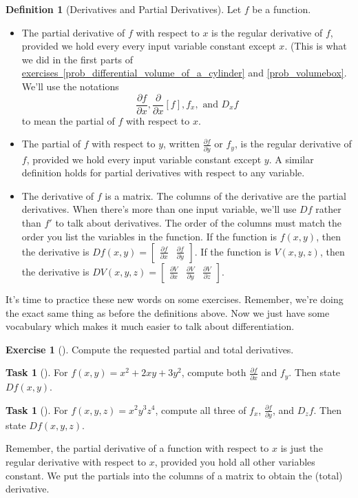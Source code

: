 \documentclass[10pt,]{book}
\theoremstyle{plain}
\theoremstyle{definition}
\newtheorem{definition}[theorem]{Definition}
\theoremstyle{definition}
\theoremstyle{definition}
\theoremstyle{definition}
\newtheorem{exploration}[project]{Exercise}
\newtheorem{task}[project]{Task}
\theoremstyle{definition}
\numberwithin{equation}{section}
\newcommand{\ds}{\displaystyle}
\newcommand{\amp}{&}
\begin{document}
%
\begin{definition}[{Derivatives and Partial Derivatives}]\label{definition-23}
Let \(f\) be a function. \leavevmode%
\begin{itemize}[label=\textbullet]
\item{}The partial derivative of \(f\) with respect to \(x\) is the regular derivative of \(f\), provided we hold every every input variable constant except \(x\). (This is what we did in the first parts of \hyperref[prob_differential_volume_of_a_cylinder]{exercises~\ref{prob_differential_volume_of_a_cylinder}} and \hyperref[prob_volumebox]{\ref{prob_volumebox}}.  We'll use the notations%
\begin{equation*}
\frac{\partial f}{\partial x}, 
\frac{\partial}{\partial x}[f],
f_x,
\text{ and } D_x f
\end{equation*}
to mean the partial of \(f\) with respect to \(x\).%
\item{}The partial of \(f\) with respect to \(y\), written \(\ds \frac{\partial f}{\partial y}\) or \(f_y\), is the regular derivative of \(f\), provided we hold every input variable constant except \(y\). A similar definition holds for partial derivatives with respect to any variable.%
\item{}The derivative of \(f\) is a matrix. The columns of the derivative are the partial derivatives. When there's more than one input variable, we'll use \(Df\) rather than \(f'\) to talk about derivatives.  The order of the columns must match the order you list the variables in the function. If the function is \(f(x,y)\), then the derivative is \(Df(x,y) = \begin{bmatrix}\frac{\partial f}{\partial x}\amp \frac{\partial f}{\partial y}
\end{bmatrix} .\) If the function is \(V(x,y,z)\), then the derivative is \(DV(x,y,z) = \begin{bmatrix}\frac{\partial V}{\partial x}\amp \frac{\partial V}{\partial y}\amp \frac{\partial V}{\partial z}
\end{bmatrix} .\)%
\end{itemize}
%
\end{definition}
It's time to practice these new words on some exercises. Remember, we're doing the exact same thing as before the definitions above. Now we just have some vocabulary which makes it much easier to talk about differentiation.%
\begin{exploration}[]\label{exploration-136}
Compute the requested partial and total derivatives.%
\begin{task}[]\label{task-285}
For \(f(x,y)=x^2+2xy+3y^2\), compute both \(\ds\frac{\partial f}{\partial x}\) and \(f_y\). Then state \(Df(x,y)\).%
\end{task}
\begin{task}[]\label{task-286}
For \(f(x,y,z)=x^2y^3z^4\), compute all three of \(f_x\), \(\ds\frac{\partial f}{\partial y}\), and \(D_z f\). Then state \(Df(x,y,z)\).%
\end{task}
Remember, the partial derivative of a function with respect to \(x\) is just the regular derivative with respect to \(x\), provided you hold all other variables constant. We put the partials into the columns of a matrix to obtain the (total) derivative.%
\end{exploration}
\end{document}
